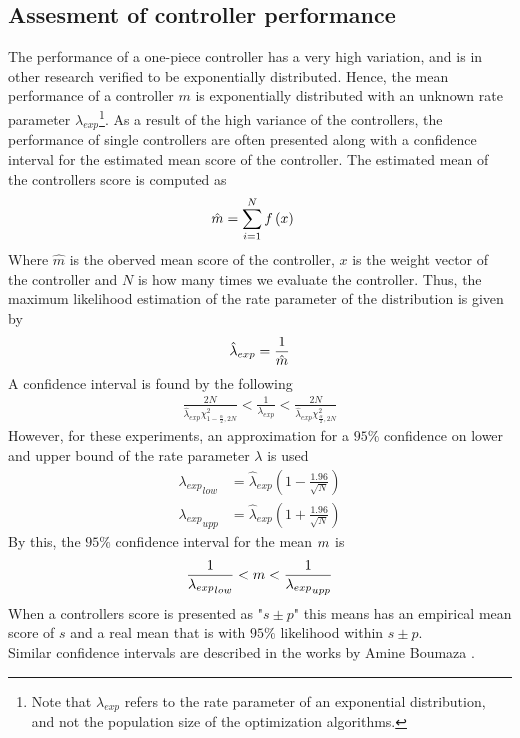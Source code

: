 \subsection{Assesment of controller performance \label{sec:confidenceIntervals}}
The performance of a one-piece controller has a very high variation,
and is in other research verified to be exponentially distributed. Hence, the mean
performance of a controller $m$ is exponentially distributed with an unknown 
rate parameter  $\lambda_{exp}$\footnote{Note that $\lambda_{exp}$ refers to the rate parameter
of an exponential distribution, and not the population size of the optimization algorithms.}.
As a result of the high variance of the controllers, the performance 
of single controllers are often presented along with a confidence interval
for the estimated mean score of the controller. The estimated mean of 
the controllers score is computed as
\begin{align}
\hat{m} &= \sum_{i=1}^{N} f \left( x \right)
\end{align}
Where $\hat{m}$ is the oberved mean score of the controller, $x$ is the
weight vector of the controller and $N$ is how many times we evaluate the controller.
Thus, the maximum likelihood estimation of the rate 
parameter
of the distribution is given by
\begin{align}
\hat{\lambda}_{exp} = \frac{1}{\hat{m}}
\end{align}
A confidence interval is found by the following
\begin{align}
\frac{2N}{\hat{\lambda}_{exp}\chi^{2}_{1-\frac{\alpha}{2},2N}}
<
\frac{1}{\lambda_{exp}}
< 
\frac{2N}{\hat{\lambda}_{exp}\chi^{2}_{\frac{\alpha}{2},2N}}
\end{align}
However, for these experiments, an approximation for a $95\%$
confidence on lower and upper bound 
of the rate parameter $\lambda$ is used
\begin{align}
{\lambda_{exp}}_{low} &= 
\hat{\lambda}_{exp} \left( 1 - \frac{1.96}{\sqrt{N}} \right)\\
{\lambda_{exp}}_{upp} &= 
\hat{\lambda}_{exp} \left( 1 + \frac{1.96}{\sqrt{N}} \right)
\end{align}
By this, the $95\%$ confidence interval for the mean $m$ is
\begin{align}
\frac{1}{{\lambda_{exp}}_{low}} < m < \frac{1}{{\lambda_{exp}}_{upp}}
\end{align}
When a controllers score is presented as "$s \pm p$" this means 
has an empirical mean score of $s$ and a real mean that is with 
$95\%$ likelihood within $s \pm p$. \\
Similar confidence intervals are described in the works by Amine Boumaza \citep{boumaza2009}.
